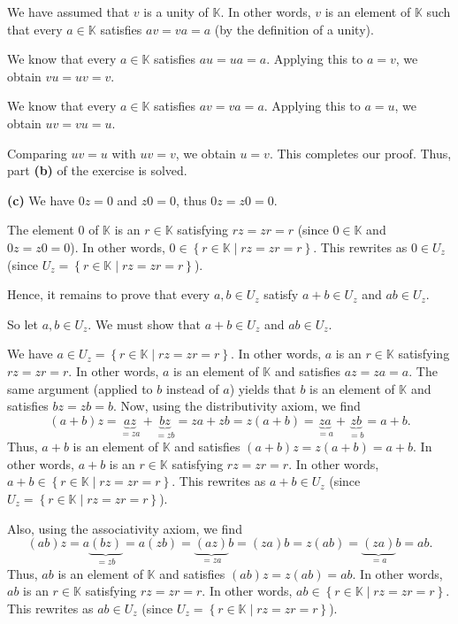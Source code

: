 \documentclass[paper=a4, fontsize=12pt]{scrartcl}%
\theoremstyle{plainsl}
\theoremstyle{definition}
\theoremstyle{remark}
\begin{document}
We have assumed that $v$ is a unity of $\mathbb{K}$. In other words, $v$ is an
element of $\mathbb{K}$ such that every $a\in\mathbb{K}$ satisfies $av=va=a$
(by the definition of a unity).

We know that every $a\in\mathbb{K}$ satisfies $au=ua=a$. Applying this to
$a=v$, we obtain $vu=uv=v$.

We know that every $a\in\mathbb{K}$ satisfies $av=va=a$. Applying this to
$a=u$, we obtain $uv=vu=u$.

Comparing $uv=u$ with $uv=v$, we obtain $u=v$. This completes our proof. Thus,
part \textbf{(b)} of the exercise is solved.

\bigskip

\textbf{(c)} We have $0z=0$ and $z0=0$, thus $0z=z0=0$.

The element $0$ of $\mathbb{K}$ is an $r\in\mathbb{K}$ satisfying $rz=zr=r$
(since $0\in\mathbb{K}$ and $0z=z0=0$). In other words, $0\in\left\{
r\in\mathbb{K}\mid rz=zr=r\right\}  $. This rewrites as $0\in U_{z}$ (since
$U_{z}=\left\{  r\in\mathbb{K}\mid rz=zr=r\right\}  $).

Hence, it remains to prove that every $a,b\in U_{z}$ satisfy $a+b\in U_{z}$
and $ab\in U_{z}$.

So let $a,b\in U_{z}$. We must show that $a+b\in U_{z}$ and $ab\in U_{z}$.

We have $a\in U_{z}=\left\{  r\in\mathbb{K}\mid rz=zr=r\right\}  $. In other
words, $a$ is an $r\in\mathbb{K}$ satisfying $rz=zr=r$. In other words, $a$ is
an element of $\mathbb{K}$ and satisfies $az=za=a$. The same argument (applied
to $b$ instead of $a$) yields that $b$ is an element of $\mathbb{K}$ and
satisfies $bz=zb=b$. Now, using the distributivity axiom, we find%
\[
\left(  a+b\right)  z=\underbrace{az}_{=za}+\underbrace{bz}_{=zb}%
=za+zb=z\left(  a+b\right)  =\underbrace{za}_{=a}+\underbrace{zb}_{=b}=a+b.
\]
Thus, $a+b$ is an element of $\mathbb{K}$ and satisfies $\left(  a+b\right)
z=z\left(  a+b\right)  =a+b$. In other words, $a+b$ is an $r\in\mathbb{K}$
satisfying $rz=zr=r$. In other words, $a+b\in\left\{  r\in\mathbb{K}\mid
rz=zr=r\right\}  $. This rewrites as $a+b\in U_{z}$ (since $U_{z}=\left\{
r\in\mathbb{K}\mid rz=zr=r\right\}  $).

Also, using the associativity axiom, we find%
\[
\left(  ab\right)  z=a\underbrace{\left(  bz\right)  }_{=zb}=a\left(
zb\right)  =\underbrace{\left(  az\right)  }_{=za}b=\left(  za\right)
b=z\left(  ab\right)  =\underbrace{\left(  za\right)  }_{=a}b=ab.
\]
Thus, $ab$ is an element of $\mathbb{K}$ and satisfies $\left(  ab\right)
z=z\left(  ab\right)  =ab$. In other words, $ab$ is an $r\in\mathbb{K}$
satisfying $rz=zr=r$. In other words, $ab\in\left\{  r\in\mathbb{K}\mid
rz=zr=r\right\}  $. This rewrites as $ab\in U_{z}$ (since $U_{z}=\left\{
r\in\mathbb{K}\mid rz=zr=r\right\}  $).
\end{document}
